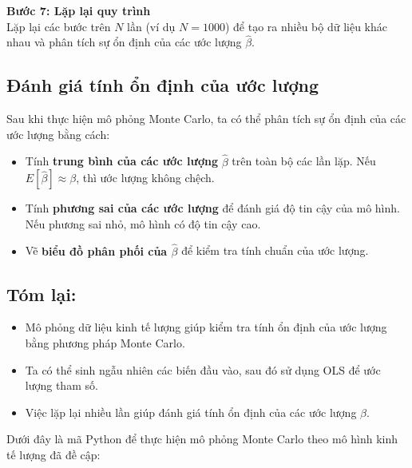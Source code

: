 \textbf{Bước 7: Lặp lại quy trình}  \\
Lặp lại các bước trên $N$ lần (ví dụ $N = 1000$) để tạo ra nhiều bộ dữ liệu khác nhau và phân tích sự ổn định của các ước lượng $\hat{\beta}$.

\subsection{Đánh giá tính ổn định của ước lượng}

Sau khi thực hiện mô phỏng Monte Carlo, ta có thể phân tích sự ổn định của các ước lượng bằng cách:
\begin{itemize}
    \item Tính \textbf{trung bình của các ước lượng} $\hat{\beta}$ trên toàn bộ các lần lặp. Nếu $E[\hat{\beta}] \approx \beta$, thì ước lượng không chệch.
    \item Tính \textbf{phương sai của các ước lượng} để đánh giá độ tin cậy của mô hình. Nếu phương sai nhỏ, mô hình có độ tin cậy cao.
    \item Vẽ \textbf{biểu đồ phân phối của $\hat{\beta}$} để kiểm tra tính chuẩn của ước lượng.
\end{itemize}

\subsection*{Tóm lại: }
\begin{itemize}
    \item Mô phỏng dữ liệu kinh tế lượng giúp kiểm tra tính ổn định của ước lượng bằng phương pháp Monte Carlo.
    \item Ta có thể sinh ngẫu nhiên các biến đầu vào, sau đó sử dụng OLS để ước lượng tham số.
    \item Việc lặp lại nhiều lần giúp đánh giá tính ổn định của các ước lượng $\beta$.
\end{itemize}


Dưới đây là mã Python để thực hiện mô phỏng Monte Carlo theo mô hình kinh tế lượng đã đề cập:

